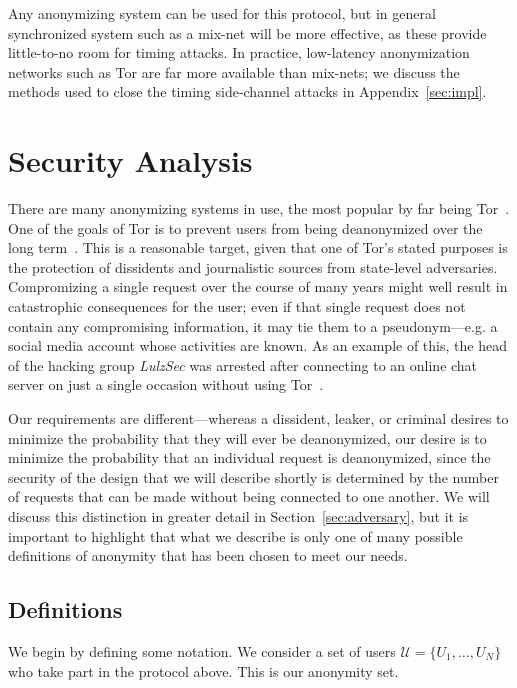 \documentclass[USenglish]{llncs}
\begin{document}
Any anonymizing system can be used for this protocol, but in general synchronized
system such as a mix-net will be more effective, as these provide little-to-no room for
timing attacks.  In practice, low-latency anonymization networks such as Tor are far
more available than mix-nets; we discuss the methods used to close the timing
side-channel attacks in Appendix~\ref{sec:impl}.

\section{Security Analysis}\label{sec:analysis}

There are many anonymizing systems in use,
the most popular by far being Tor~\cite{tor-design}.
One of the goals of Tor is
to prevent users from being deanonymized over the long
term~\cite{tor-design}.  This is a reasonable target, given that one of Tor's
stated purposes is the protection of dissidents and journalistic sources
from state-level adversaries.  Compromizing a single request over the course
of many years might well result in catastrophic consequences for the user; even
if that single request does not contain any compromising information, it may tie
them to a pseudonym---e.g. a social media account whose activities are known.
As an example of this, the head of the hacking group \emph{LulzSec} was
arrested after connecting to an online chat server on just a single occasion
without using Tor~\cite{register-lulzsec}.

Our requirements are different---whereas a dissident, leaker, or criminal
desires to minimize the probability that they will ever be deanonymized,
our desire is to minimize the probability that an individual request is
deanonymized, since the security of the
design that we will describe shortly is determined by the number
of requests that can be made without being connected to one another.
We will discuss this distinction in greater detail in Section~\ref{sec:adversary},
but it is important to highlight that what we describe is only one of many
possible definitions of anonymity that has been chosen to meet our needs.

\subsection{Definitions}\label{sec:notation}

We begin by defining some notation.  We consider a set of users
$\mathcal{U} = \{U_1, \ldots, U_N\}$ who take part in the protocol above.
This is our anonymity set.
\end{document}
